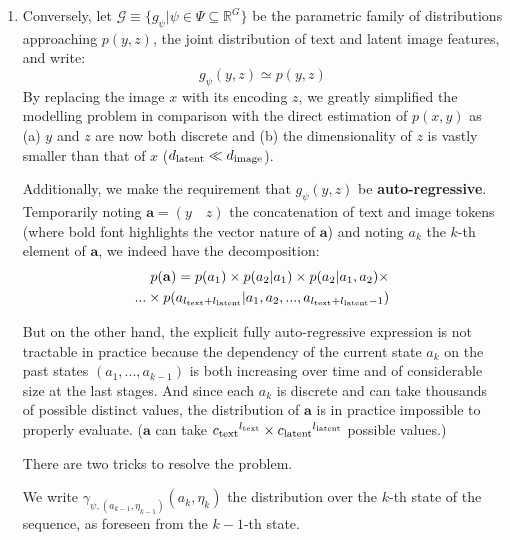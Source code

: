 \documentclass{article}
\begin{document}
\begin{multicols}{2}
\begin{enumerate}
    \item Conversely, let $\mathcal{G} \equiv \{g_{\psi} | \psi\in\Psi \subseteq \mathbb{R}^{G} \}$ be the parametric family of distributions approaching $p(y,z)$, the joint distribution of text and latent image features, and write:
    $$g_{\psi}(y,z)\simeq p(y,z)$$
    By replacing the image $x$ with its encoding $z$, we greatly simplified the modelling problem in comparison with the direct estimation of $p(x,y)$ as (a) $y$ and $z$ are now both discrete and (b) the dimensionality of $z$ is vastly smaller than that of $x$ (${d_{\mathrm{latent}}}\ll d_{\mathrm{image}}$).
    
    Additionally, we make the requirement that $g_\psi(y,z)$ be \textbf{auto-regressive}. Temporarily noting $\mathbf{a}=(y \quad z)$ the concatenation of text and image tokens (where bold font highlights the vector nature of $\mathbf{a}$) and noting $a_k$ the $k$-th element of $\mathbf{a}$, we indeed have the decomposition: \begin{equation*} \begin{split}
    p(\mathbf{a}) = p(a_1) \times p(a_2|a_1) \times p(a_2|a_1,a_2) \times \\ ... \times p(a_{{l_{\mathrm{text}}}+{l_{\mathrm{latent}}}}|a_1,a_2,...,a_{{l_{\mathrm{text}}}+{l_{\mathrm{latent}}}-1})\end{split} \end{equation*}
    
    But on the other hand, the explicit fully auto-regressive expression is not tractable in practice because the dependency of the current state $a_k$ on the past states $(a_1,..., a_{k-1})$ is both increasing over time and of considerable size at the last stages. And since each $a_k$ is discrete and can take thousands of possible distinct values, the distribution of $\mathbf{a}$ is in practice impossible to properly evaluate. ($\mathbf{a}$ can take ${c_{\mathrm{text}}}^{l_{\mathrm{text}}}\times{c_{\mathrm{latent}}}^{l_{\mathrm{latent}}}$ possible values.)
    
    There are two tricks to resolve the problem. 
    We write $\gamma_{\psi, (a_{k-1},\eta_{k-1})}(a_k, \eta_k)$ the distribution over the $k$-th state of the sequence, as foreseen from the $k-1$-th state.
    

\end{enumerate}
\end{multicols}
\end{document}
